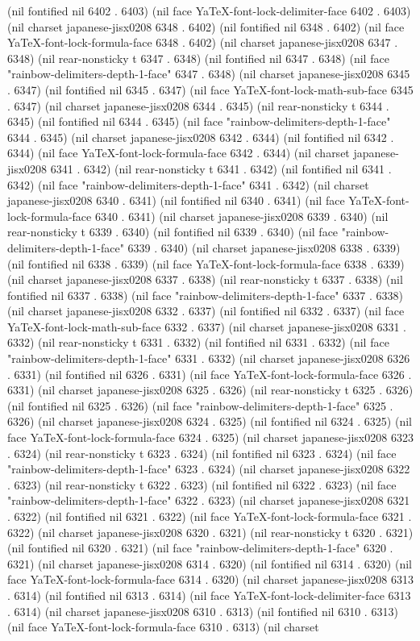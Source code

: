 (nil fontified nil 6402 . 6403) (nil face YaTeX-font-lock-delimiter-face 6402 . 6403) (nil charset japanese-jisx0208 6348 . 6402) (nil fontified nil 6348 . 6402) (nil face YaTeX-font-lock-formula-face 6348 . 6402) (nil charset japanese-jisx0208 6347 . 6348) (nil rear-nonsticky t 6347 . 6348) (nil fontified nil 6347 . 6348) (nil face "rainbow-delimiters-depth-1-face" 6347 . 6348) (nil charset japanese-jisx0208 6345 . 6347) (nil fontified nil 6345 . 6347) (nil face YaTeX-font-lock-math-sub-face 6345 . 6347) (nil charset japanese-jisx0208 6344 . 6345) (nil rear-nonsticky t 6344 . 6345) (nil fontified nil 6344 . 6345) (nil face "rainbow-delimiters-depth-1-face" 6344 . 6345) (nil charset japanese-jisx0208 6342 . 6344) (nil fontified nil 6342 . 6344) (nil face YaTeX-font-lock-formula-face 6342 . 6344) (nil charset japanese-jisx0208 6341 . 6342) (nil rear-nonsticky t 6341 . 6342) (nil fontified nil 6341 . 6342) (nil face "rainbow-delimiters-depth-1-face" 6341 . 6342) (nil charset japanese-jisx0208 6340 . 6341) (nil fontified nil 6340 . 6341) (nil face YaTeX-font-lock-formula-face 6340 . 6341) (nil charset japanese-jisx0208 6339 . 6340) (nil rear-nonsticky t 6339 . 6340) (nil fontified nil 6339 . 6340) (nil face "rainbow-delimiters-depth-1-face" 6339 . 6340) (nil charset japanese-jisx0208 6338 . 6339) (nil fontified nil 6338 . 6339) (nil face YaTeX-font-lock-formula-face 6338 . 6339) (nil charset japanese-jisx0208 6337 . 6338) (nil rear-nonsticky t 6337 . 6338) (nil fontified nil 6337 . 6338) (nil face "rainbow-delimiters-depth-1-face" 6337 . 6338) (nil charset japanese-jisx0208 6332 . 6337) (nil fontified nil 6332 . 6337) (nil face YaTeX-font-lock-math-sub-face 6332 . 6337) (nil charset japanese-jisx0208 6331 . 6332) (nil rear-nonsticky t 6331 . 6332) (nil fontified nil 6331 . 6332) (nil face "rainbow-delimiters-depth-1-face" 6331 . 6332) (nil charset japanese-jisx0208 6326 . 6331) (nil fontified nil 6326 . 6331) (nil face YaTeX-font-lock-formula-face 6326 . 6331) (nil charset japanese-jisx0208 6325 . 6326) (nil rear-nonsticky t 6325 . 6326) (nil fontified nil 6325 . 6326) (nil face "rainbow-delimiters-depth-1-face" 6325 . 6326) (nil charset japanese-jisx0208 6324 . 6325) (nil fontified nil 6324 . 6325) (nil face YaTeX-font-lock-formula-face 6324 . 6325) (nil charset japanese-jisx0208 6323 . 6324) (nil rear-nonsticky t 6323 . 6324) (nil fontified nil 6323 . 6324) (nil face "rainbow-delimiters-depth-1-face" 6323 . 6324) (nil charset japanese-jisx0208 6322 . 6323) (nil rear-nonsticky t 6322 . 6323) (nil fontified nil 6322 . 6323) (nil face "rainbow-delimiters-depth-1-face" 6322 . 6323) (nil charset japanese-jisx0208 6321 . 6322) (nil fontified nil 6321 . 6322) (nil face YaTeX-font-lock-formula-face 6321 . 6322) (nil charset japanese-jisx0208 6320 . 6321) (nil rear-nonsticky t 6320 . 6321) (nil fontified nil 6320 . 6321) (nil face "rainbow-delimiters-depth-1-face" 6320 . 6321) (nil charset japanese-jisx0208 6314 . 6320) (nil fontified nil 6314 . 6320) (nil face YaTeX-font-lock-formula-face 6314 . 6320) (nil charset japanese-jisx0208 6313 . 6314) (nil fontified nil 6313 . 6314) (nil face YaTeX-font-lock-delimiter-face 6313 . 6314) (nil charset japanese-jisx0208 6310 . 6313) (nil fontified nil 6310 . 6313) (nil face YaTeX-font-lock-formula-face 6310 . 6313) (nil charset 